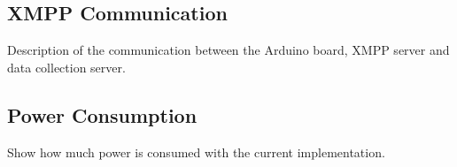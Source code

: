 \subsection{XMPP Communication}

Description of the communication between the Arduino board, XMPP server and data collection server.



\subsection{Power Consumption}

Show how much power is consumed with the current implementation. 




